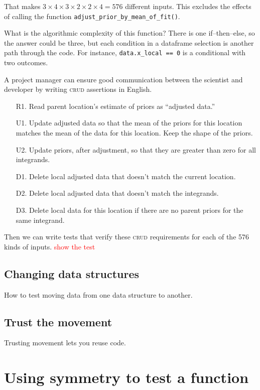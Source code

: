\documentclass[fleqn,10pt]{olplainarticle}
\newcommand{\aside}[1]{\textcolor{red}{#1}}
\begin{document}
That makes $3\times 4 \times 3\times 2\times 2\times 4=576$ different inputs.
This excludes the effects of calling the function
\lstinline!adjust_prior_by_mean_of_fit()!.

What is the algorithmic complexity of this function? There is one
if--then--else, so the answer could be three, but each condition in a dataframe
selection is another path through the code. For instance,
\lstinline!data.x_local == 0! is a conditional with two outcomes.

A project manager can ensure good communication between the scientist and
developer by writing \textsc{crud} assertions in English.
\begin{itemize}
    \item[R1.] Read parent location's estimate of priors as ``adjusted data.''
    \item[U1.] Update adjusted data so that the mean of the priors for this location matches
        the mean of the data for this location. Keep the shape of the priors.
    \item[U2.] Update priors, after adjustment, so that they are greater
        than zero for all integrands.
    \item[D1.] Delete local adjusted data that doesn't match the current location.
    \item[D2.] Delete local adjusted data that doesn't match the integrands.
    \item[D3.] Delete local data for this location if there are no parent
        priors for the same integrand.
\end{itemize}
Then we can write tests that verify these \textsc{crud} requirements for
each of the 576 kinds of inputs. \aside{show the test}

\subsection{Changing data structures}
How to test moving data from one data structure to another.

\subsection{Trust the movement}
Trusting movement lets you reuse code.



\section{Using symmetry to test a function}
\end{document}
